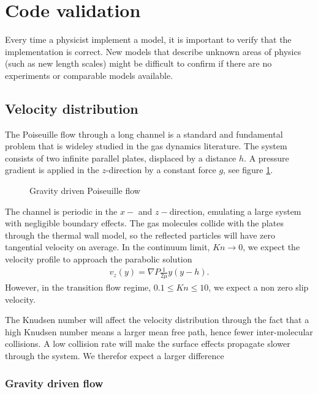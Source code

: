 \section{Code validation}
Every time a physicist implement a model, it is important to verify that the implementation is correct. New models that describe unknown areas of physics (such as new length scales) might be difficult to confirm if there are no experiments or comparable models available. 
\subsection{Velocity distribution}
The Poiseuille flow through a long channel is a standard and fundamental problem that is wideley studied in the gas dynamics literature. The system consists of two infinite parallel plates, displaced by a distance $h$. A pressure gradient is applied in the $z$-direction by a constant force $g$, see figure \ref{fig:dsmc_validation_poiseuille}. 

\begin{figure}[htp]
\centering
\label{fig:dsmc_validation_poiseuille}
\caption{Gravity driven Poiseuille flow}
\end{figure}

The channel is periodic in the $x-$ and $z-$direction, emulating a large system with negligible boundary effects. The gas molecules collide with the plates through the thermal wall model, so the reflected particles will have zero tangential velocity on average. In the continuum limit, $Kn\rightarrow 0$, we expect the velocity profile to approach the parabolic solution \cite{batchelor2000introduction}
\begin{align}
	v_z(y) = \nabla P\frac{1}{2\mu}y(y-h).
\end{align}
However, in the transition flow regime, $0.1 \leq Kn \leq 10$, we expect a non zero slip velocity\cite{morris1992slip}. 

The Knudsen number will affect the velocity distribution through the fact that a high Knudsen number means a larger mean free path, hence fewer inter-molecular collisions. A low collision rate will make the surface effects propagate slower through the system. We therefor expect a larger difference 

\subsubsection{Gravity driven flow}
